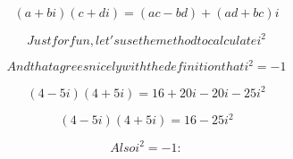 \[(a+bi)(c+di) = (ac-bd) + (ad+bc)i\]

\[Just for fun, let's use the method to calculate i^{2}\]

\[And that agrees nicely with the definition that i^{2 }= -1\]

\[(4 - 5i)(4 + 5i) = 16 + 20i - 20i - 25i^{2}\]

\[(4 - 5i)(4 + 5i) = 16 - 25i^{2}\]

\[Also i^{2} = -1 :\]

